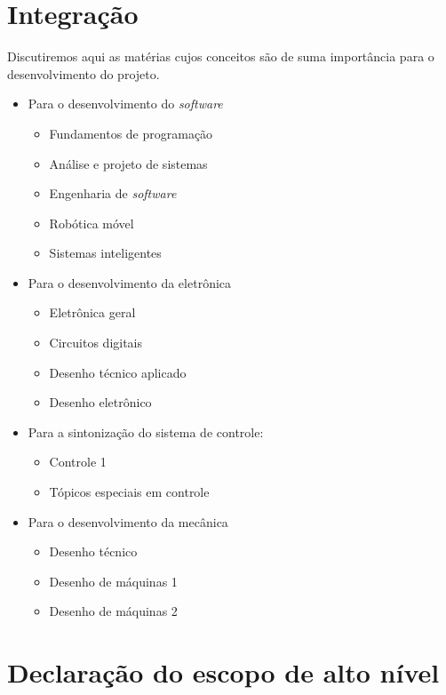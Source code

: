 \section{\textbf{Integração}}
Discutiremos aqui as matérias cujos conceitos são de suma importância para o desenvolvimento do projeto. 
\begin{itemize}
   \item Para o desenvolvimento do \textit{software}
      \begin{itemize}
         \item Fundamentos de programação
         \item Análise e projeto de sistemas
         \item Engenharia de \textit{software}
         \item Robótica móvel 
         \item Sistemas inteligentes
      \end{itemize}
   \item Para o desenvolvimento da eletrônica
      \begin{itemize}
         \item Eletrônica geral
         \item Circuitos digitais
         \item Desenho técnico aplicado 
         \item Desenho eletrônico
      \end{itemize}
   \item Para a sintonização do sistema de controle: 
      \begin{itemize}
         \item Controle 1 
         \item Tópicos especiais em controle 
      \end{itemize}
   \item Para o desenvolvimento da mecânica
      \begin{itemize}
         \item Desenho técnico 
         \item Desenho de máquinas 1
         \item Desenho de máquinas 2
      \end{itemize}
\end{itemize}


\section{\textbf{Declaração do escopo de alto nível}}

